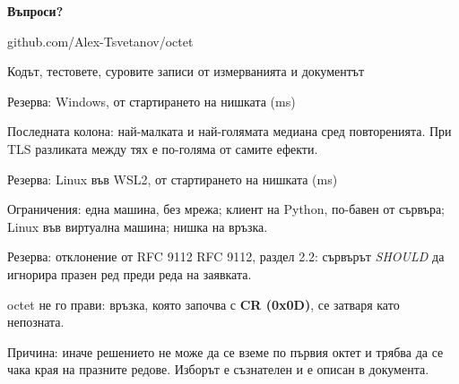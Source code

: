 \documentclass[aspectratio=169, 11pt]{beamer}
\newcommand{\code}[1]{{\ttfamily #1}}
\newcommand{\hex}[1]{{\ttfamily\bfseries #1}}
\begin{document}
\begin{frame}[plain]
\centering
\vfill
{\Huge\bfseries Въпроси?\par}
\vspace{1.5em}
{\large\ttfamily github.com/Alex-Tsvetanov/octet\par}
\vspace{0.6em}
{\small\color{muted} Кодът, тестовете, суровите записи от измерванията и документът\par}
\vfill
\end{frame}

\appendix

\begin{frame}{Резерва: Windows, от стартирането на нишката (ms)}
\centering\small
\par\bigskip
{\footnotesize Последната колона: най-малката и най-голямата медиана сред повторенията.
При TLS разликата между тях е по-голяма от самите ефекти.\par}
\end{frame}

\begin{frame}{Резерва: Linux във WSL2, от стартирането на нишката (ms)}
\centering\small
\par\bigskip
{\footnotesize Ограничения: една машина, без мрежа; клиент на Python, по-бавен от сървъра;
Linux във виртуална машина; нишка на връзка.\par}
\end{frame}

\begin{frame}{Резерва: отклонение от RFC 9112}
RFC 9112, раздел 2.2: сървърът \emph{SHOULD} да игнорира празен ред преди реда на заявката.\par\medskip
\code{octet} не го прави: връзка, която започва с \hex{CR (0x0D)}, се затваря като непозната.\par\medskip
Причина: иначе решението не може да се вземе по първия октет и трябва да се чака края на
празните редове. Изборът е съзнателен и е описан в документа.
\end{frame}
\end{document}
